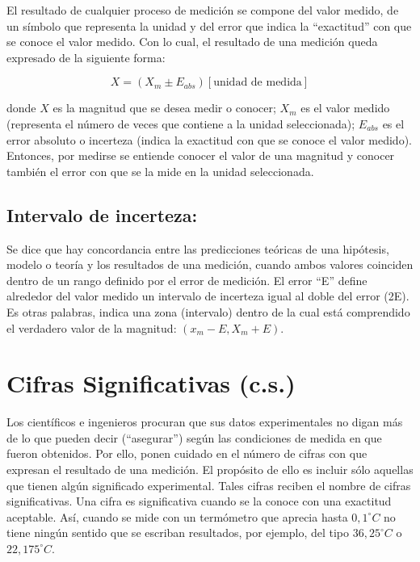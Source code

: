 El resultado de cualquier proceso de medición se compone del valor medido, de un símbolo que representa la unidad y del error que 
indica la ``exactitud'' con que se conoce el valor medido.  Con lo cual, el resultado de una medición queda expresado de la 
siguiente forma:

\begin{equation}
 X = (X_m \pm E_{abs})[\text{unidad de medida}]
\end{equation}

donde $X$ es la  magnitud que se desea medir o conocer; $X_m$  es  el  valor  medido  (representa  el número de veces que 
contiene a la unidad seleccionada); $E_{abs}$ es el error absoluto o incerteza (indica la exactitud con que se conoce el valor 
medido). Entonces, por medirse se entiende conocer el valor de una magnitud y conocer también el error con que se la mide en la 
unidad seleccionada.

\subsection{Intervalo de incerteza:}

Se dice que hay concordancia entre las predicciones teóricas de una hipótesis, modelo o teoría y los resultados de una medición,  
cuando  ambos  valores  coinciden  dentro  de  un  rango  definido  por  el error de medición. El error ``E'' define alrededor 
del valor medido un intervalo de incerteza igual al doble  del  error  (2E). Es otras palabras, indica una zona (intervalo) 
dentro de la cual está comprendido el verdadero valor de la magnitud: $(x_m - E, X_m + E)$.

\section{Cifras Significativas (c.s.)}

Los científicos e ingenieros procuran que sus datos experimentales no digan más de lo que pueden decir  (``asegurar'')  según  
las condiciones de medida en que fueron obtenidos. Por ello, ponen cuidado en el número de cifras con que expresan el resultado  
de una medición. El  propósito  de ello  es  incluir sólo aquellas  que  tienen  algún  significado  experimental. Tales cifras  
reciben  el nombre de cifras significativas.  Una cifra es significativa cuando se la conoce con una exactitud aceptable. Así,  
cuando  se  mide  con  un  termómetro  que  aprecia  hasta  $0,1^\circ C$  no  tiene  ningún sentido que se escriban resultados, 
por ejemplo, del tipo $36,25^\circ C$ o $22,175^\circ C$.\\


